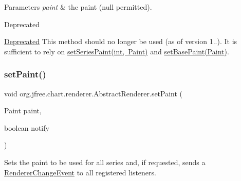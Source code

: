 \begin{DoxyParams}{Parameters}
{\em paint} & the paint ({\ttfamily null} permitted).\\
\hline
\end{DoxyParams}
\begin{DoxyRefDesc}{Deprecated}
\item[\mbox{\hyperlink{deprecated__deprecated000116}{Deprecated}}]This method should no longer be used (as of version 1..). It is sufficient to rely on \mbox{\hyperlink{classorg_1_1jfree_1_1chart_1_1renderer_1_1_abstract_renderer_a65149cab3fbc60f7e6b1b51fbd5a29ed}{set\+Series\+Paint(int, Paint)}} and \mbox{\hyperlink{classorg_1_1jfree_1_1chart_1_1renderer_1_1_abstract_renderer_aa52fbb777d55d74a89d024d2a46dc794}{set\+Base\+Paint(\+Paint)}}. \end{DoxyRefDesc}
\mbox{\label{classorg_1_1jfree_1_1chart_1_1renderer_1_1_abstract_renderer_a0b70f8247a421f9e81462bd49972b790}} 
\subsubsection{\texorpdfstring{set\+Paint()}{setPaint()}\hspace{0.1cm}{\footnotesize\ttfamily [2/2]}}
{\footnotesize\ttfamily void org.\+jfree.\+chart.\+renderer.\+Abstract\+Renderer.\+set\+Paint (\begin{DoxyParamCaption}\item[{Paint}]{paint,  }\item[{boolean}]{notify }\end{DoxyParamCaption})}

Sets the paint to be used for all series and, if requested, sends a \mbox{\hyperlink{}{Renderer\+Change\+Event}} to all registered listeners.



